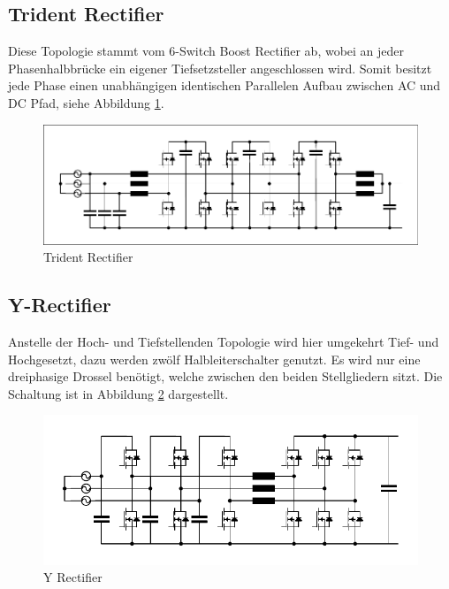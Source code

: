 	\subsection{Trident Rectifier}
		Diese Topologie stammt vom 6-Switch Boost Rectifier ab, wobei an jeder Phasenhalbbrücke ein eigener Tiefsetzsteller angeschlossen wird. Somit besitzt jede Phase einen unabhängigen identischen Parallelen Aufbau zwischen AC und DC Pfad, siehe Abbildung \ref{fig:trident}. 
		\begin{figure}[H]
			\centering
			\includegraphics[width=0.9\linewidth]{content/Grafiken/Trident}
			\caption{Trident Rectifier}
			\label{fig:trident}
		\end{figure}
		
	\subsection{Y-Rectifier}
		Anstelle der Hoch- und Tiefstellenden Topologie wird hier umgekehrt Tief- und Hochgesetzt, dazu werden zwölf Halbleiterschalter genutzt. Es wird nur eine dreiphasige Drossel benötigt, welche zwischen den beiden Stellgliedern sitzt. Die Schaltung ist in Abbildung \ref{fig:y-rectifier} dargestellt.
		
	
		\begin{figure}[H]
			\centering
			\includegraphics[width=0.9\linewidth]{content/Grafiken/Y-Rectifier}
			\caption{Y Rectifier}
			\label{fig:y-rectifier}
		\end{figure}
	
